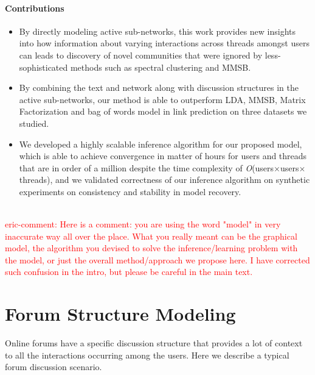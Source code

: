 \documentclass{sig-alternate}
\newcommand{\ericx}[1]{\textcolor{red}{\\ eric-comment: #1}}
\newcommand{\order}[1]{\textit{O}(#1)}
\begin{document}
\vspace*{-0.5\baselineskip}
\paragraph{Contributions}
\vspace*{-0.5\baselineskip}
\begin{itemize}
  \item By directly modeling active sub-networks, this work provides new insights into how information about varying interactions across threads amongst users can leads to discovery of novel communities that were ignored by less-sophisticated methods such as spectral clustering and MMSB.
 \item By combining the text and network along with discussion structures in the active sub-networks, our method is able to outperform LDA, MMSB, Matrix Factorization and bag of words model in link prediction on three datasets we studied.
\item We developed a highly scalable inference algorithm for our proposed model, which is able to achieve convergence in
matter of hours for users and threads that are in order of a million despite the time complexity of \order{users$\times$users$\times$threads}, and we validated correctness of our inference algorithm on synthetic experiments on consistency and stability in model recovery. 
\end{itemize} 

\ericx{Here is a comment: you are using the word "model" in very inaccurate way all over the place. What you really meant can be the graphical model, the algorithm you devised to solve the inference/learning problem with the model, or just the overall method/approach we propose here. I have corrected such confusion in the intro, but please be careful in the main text.}


\section{Forum Structure Modeling}
\label{sec:approach}
Online forums have a specific discussion structure  that
provides a lot of context to all the interactions occurring among the users.
Here we describe a typical forum discussion scenario.
\end{document}

